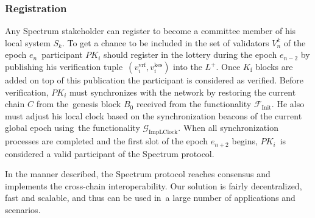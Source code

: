 \subsubsection{Registration}\label{subsubsec:registration}
Any Spectrum stakeholder can register to become a committee member of his local system $S_k$.
To get a chance to be included in the set of validators $V^k_n$ of the epoch $e_n$\
participant $PK_i$ should register in the lottery during the epoch $e_{n-2}$ by publishing his verification tuple\
${(v_i^{\text{vrf}}, v_i^{\text{kes}})}$ into the $L^+$.
Once $K_{\text{f}}$ blocks are added on top of this publication the participant is considered as verified.
Before verification, $PK_i$ must synchronizes with the network by restoring the current chain $C$ from the\
genesis block $B_0$ received from the functionality $\mathcal{F}_{\text{Init}}$.
He also must adjust his local clock based on the synchronization beacons of the current global epoch using\
the functionality $\mathcal{G}_{\text{ImpLClock}}$.
When all synchronization processes are completed and the first slot of the epoch $e_{n + 2}$ begins, $PK_i$\
is considered a valid participant of the Spectrum protocol.

In the manner described, the Spectrum protocol reaches consensus and implements the cross-chain interoperability.
Our solution is fairly decentralized, fast and scalable, and thus can be used in\
a large number of applications and scenarios.